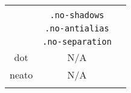 \documentclass[]{article}
\begin{document}
\begin{longtable}[c]{@{}ccc@{}}
\begin{minipage}[t]{0.25\columnwidth}
\end{minipage}
\\\addlinespace
\begin{minipage}[t]{0.28\columnwidth}\centering
\end{minipage} & \begin{minipage}[t]{0.33\columnwidth}\centering
\texttt{.no-shadows}
\end{minipage} & \begin{minipage}[t]{0.25\columnwidth}\centering
\end{minipage}
\\\addlinespace
\begin{minipage}[t]{0.28\columnwidth}\centering
\end{minipage} & \begin{minipage}[t]{0.33\columnwidth}\centering
\texttt{.no-antialias}
\end{minipage} & \begin{minipage}[t]{0.25\columnwidth}\centering
\end{minipage}
\\\addlinespace
\begin{minipage}[t]{0.28\columnwidth}\centering
\end{minipage} & \begin{minipage}[t]{0.33\columnwidth}\centering
\texttt{.no-separation}
\end{minipage} & \begin{minipage}[t]{0.25\columnwidth}\centering
\end{minipage}
\\\addlinespace
\begin{minipage}[t]{0.28\columnwidth}\centering
dot
\end{minipage} & \begin{minipage}[t]{0.33\columnwidth}\centering
N/A
\end{minipage} & \begin{minipage}[t]{0.25\columnwidth}\centering
\end{minipage}
\\\addlinespace
\begin{minipage}[t]{0.28\columnwidth}\centering
neato
\end{minipage} & \begin{minipage}[t]{0.33\columnwidth}\centering
N/A
\end{minipage} & \begin{minipage}[t]{0.25\columnwidth}\centering
\end{minipage}
\\\addlinespace

\end{longtable}
\end{document}
